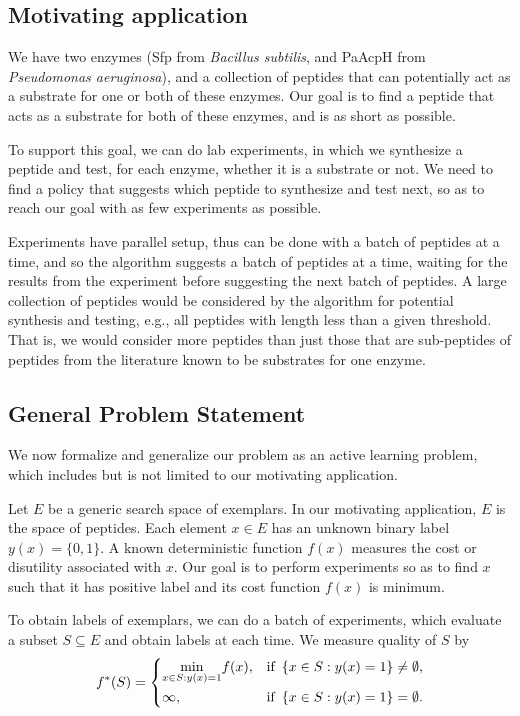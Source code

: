 \documentclass[11pt]{article}
\begin{document}
\subsection{Motivating application}\label{sec: motivate app}
We have two enzymes (Sfp from {\it Bacillus subtilis}, and PaAcpH from {\it Pseudomonas aeruginosa}), and a collection of peptides that can potentially act as a substrate for one or both of these enzymes.  Our goal is to find a peptide that acts as a substrate for both of these enzymes, and is as short as possible.

To support this goal, we can do lab experiments, in which we synthesize a peptide and test, for each enzyme, whether it is a substrate or not.  We need to find a policy that suggests which peptide to synthesize and test next, so as to reach our goal with as few experiments as possible.

Experiments have parallel setup, thus can be done with a batch of peptides at a time, and so the algorithm suggests a batch of peptides at a time, waiting for the results from the experiment before suggesting the next batch of peptides.
A large collection of peptides would be considered by the algorithm for potential synthesis and testing, e.g., all peptides with length less than a given threshold.  That is, we would consider more peptides than just those that are sub-peptides of peptides from the literature known to be substrates for one enzyme.

\subsection{General Problem Statement} \label{sec:prob state}
We now formalize and generalize our problem as an active learning problem, which includes but is not limited to our motivating application.

Let $E$ be a generic search space of exemplars.  In our motivating application, $E$ is the space of peptides.
Each element $x \in E$ has an unknown binary label $y(x)=\{0,1\}$.  A known deterministic function $f(x)$ measures the cost or disutility associated with $x$. Our goal is to perform experiments so as to find $x$ such that it has positive label and its cost function $f(x)$ is minimum.

To obtain labels of exemplars, we can do a batch of experiments, which evaluate a subset $S \subseteq E$ and obtain labels at each time. We measure quality of $S$ by
\begin{equation} \label{eq:fS}
f^*(S)= \begin{dcases}
 \underset{x \in S:y(x)=1}{\min} f(x), & \text{if \,} \{x \in S:y(x)=1\} \neq \emptyset, \\
 \infty,  & \text{if \,} \{x \in S:y(x)=1\} = \emptyset.
 \end{dcases}
\end{equation}
\end{document}
